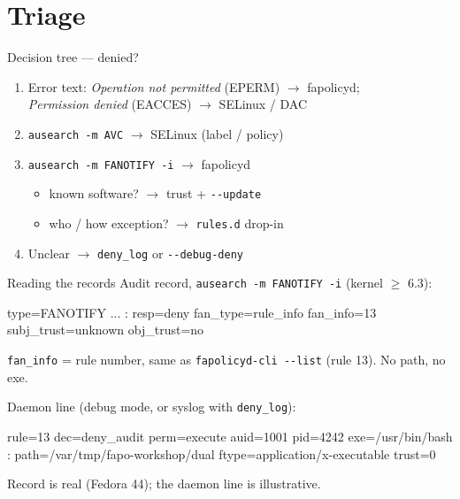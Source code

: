 \documentclass[aspectratio=169,11pt]{beamer}
\newcommand{\dd}{-{}-}
\begin{document}
\section{Triage}

\begin{frame}{Decision tree --- denied?}
  \begin{enumerate}
    \item Error text: \emph{Operation not permitted} (EPERM) $\rightarrow$ fapolicyd;\\
          \emph{Permission denied} (EACCES) $\rightarrow$ SELinux / DAC
    \item \texttt{ausearch -m AVC} $\rightarrow$ SELinux (label / policy)
    \item \texttt{ausearch -m FANOTIFY -i} $\rightarrow$ fapolicyd
          \begin{itemize}
            \item known software? $\rightarrow$ trust + \texttt{\dd update}
            \item who / how exception? $\rightarrow$ \texttt{rules.d} drop-in
          \end{itemize}
    \item Unclear $\rightarrow$ \texttt{deny\_log} or \texttt{\dd debug-deny}
  \end{enumerate}
\end{frame}

\begin{frame}[fragile]{Reading the records}
  Audit record, \texttt{ausearch -m FANOTIFY -i} (kernel $\ge$ 6.3):
  \begin{semiverbatim}\footnotesize
type=FANOTIFY ... : resp=deny fan_type=rule_info fan_info=13
  subj_trust=unknown obj_trust=no
  \end{semiverbatim}
  {\footnotesize \texttt{fan\_info} = rule number, same as \texttt{fapolicyd-cli \dd list} (rule 13). No path, no exe.}

  \vspace{0.2em}
  Daemon line (debug mode, or syslog with \texttt{deny\_log}):
  \begin{semiverbatim}\footnotesize
rule=13 dec=deny_audit perm=execute auid=1001 pid=4242
  exe=/usr/bin/bash : path=/var/tmp/fapo-workshop/dual
  ftype=application/x-executable trust=0
  \end{semiverbatim}
  {\footnotesize Record is real (Fedora 44); the daemon line is illustrative.}
\end{frame}
\end{document}
